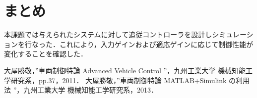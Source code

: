 \documentclass[a4paper,12pt]{jarticle}
\begin{document}
\section{まとめ}
本課題では与えられたシステムに対して追従コントローラを設計しシミュレーションを行なった．これにより，入力ゲインおよび適応ゲインに応じて制御性能が変化することを確認した．
\begin{thebibliography}{99}
 大屋勝敬，”車両制御特論 Advanced Vehicle Control ”，九州工業大学 機械知能工学研究系，pp.37，2011．
 大屋勝敬，”車両制御特論 MATLAB+Simulink の利用法 ”，九州工業大学 機械知能工学研究系，2013．
\end{thebibliography}
\end{document}
